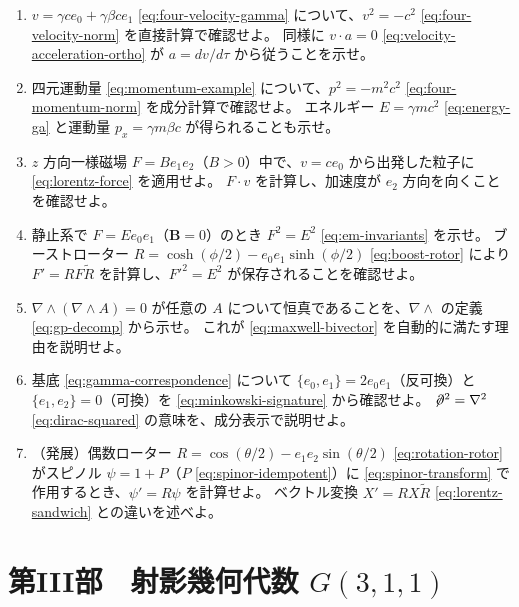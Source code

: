\documentclass[dvipdfmx,a4paper,oneside]{jsbook}
\numberwithin{equation}{chapter}
\begin{document}
\begin{enumerate}[leftmargin=2em]
  \item \(v = \gamma c e_0 + \gamma \beta c e_1\) \eqref{eq:four-velocity-gamma} について、\(v^2 = -c^2\) \eqref{eq:four-velocity-norm} を直接計算で確認せよ。
  同様に \(v\cdot a = 0\) \eqref{eq:velocity-acceleration-ortho} が \(a = dv/d\tau\) から従うことを示せ。

  \item 四元運動量 \eqref{eq:momentum-example} について、\(p^2 = -m^2 c^2\) \eqref{eq:four-momentum-norm} を成分計算で確認せよ。
  エネルギー \(E = \gamma mc^2\) \eqref{eq:energy-ga} と運動量 \(p_x = \gamma m \beta c\) が得られることも示せ。

  \item \(z\) 方向一様磁場 \(F = B e_1 e_2\)（\(B>0\)）中で、\(v = c e_0\) から出発した粒子に \eqref{eq:lorentz-force} を適用せよ。
  \(F\cdot v\) を計算し、加速度が \(e_2\) 方向を向くことを確認せよ。

  \item 静止系で \(F = E e_0 e_1\)（\(\mathbf{B}=0\)）のとき \(F^2 = E^2\) \eqref{eq:em-invariants} を示せ。
  ブーストローター \(R = \cosh(\phi/2) - e_0 e_1 \sinh(\phi/2)\) \eqref{eq:boost-rotor} により \(F' = RF\widetilde{R}\) を計算し、\(F'^2 = E^2\) が保存されることを確認せよ。

  \item \(\nabla\wedge(\nabla\wedge A) = 0\) が任意の \(A\) について恒真であることを、\(\nabla\wedge\) の定義 \eqref{eq:gp-decomp} から示せ。
  これが \eqref{eq:maxwell-bivector} を自動的に満たす理由を説明せよ。

  \item 基底 \eqref{eq:gamma-correspondence} について \(\{e_0, e_1\} = 2 e_0 e_1\)（反可換）と \(\{e_1, e_2\} = 0\)（可換）を \eqref{eq:minkowski-signature} から確認せよ。
  \(\not\!\partial^2 = \nabla^2\) \eqref{eq:dirac-squared} の意味を、成分表示で説明せよ。

  \item （発展）偶数ローター \(R = \cos(\theta/2) - e_1 e_2 \sin(\theta/2)\) \eqref{eq:rotation-rotor} がスピノル \(\psi = 1 + P\)（\(P\) \eqref{eq:spinor-idempotent}）に \eqref{eq:spinor-transform} で作用するとき、\(\psi' = R\psi\) を計算せよ。
  ベクトル変換 \(X' = RX\widetilde{R}\) \eqref{eq:lorentz-sandwich} との違いを述べよ。
\end{enumerate}

\newpage

\part{\texorpdfstring{第III部　射影幾何代数 \(G(3,1,1)\)}{第III部　射影幾何代数 G(3,1,1)}}
\end{document}
